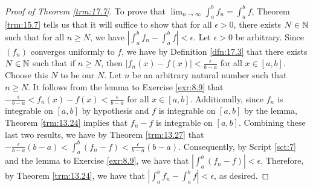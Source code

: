 \documentclass[../main.tex]{subfiles}
\begin{document}
\begin{theorem}
\begin{proof}[Proof of Theorem \ref{trm:17.7}]
        To prove that $\lim_{n\to\infty}\int_a^bf_n=\int_a^bf$, Theorem \ref{trm:15.7} tells us that it will suffice to show that for all $\epsilon>0$, there exists $N\in\mathbb{N}$ such that for all $n\geq N$, we have $|\int_a^bf_n-\int_a^bf|<\epsilon$. Let $\epsilon>0$ be arbitrary. Since $(f_n)$ converges uniformly to $f$, we have by Definition \ref{dfn:17.3} that there exists $N\in\mathbb{N}$ such that if $n\geq N$, then $|f_n(x)-f(x)|<\frac{\epsilon}{b-a}$ for all $x\in[a,b]$. Choose this $N$ to be our $N$. Let $n$ be an arbitrary natural number such that $n\geq N$. It follows from the lemma to Exercise \ref{exr:8.9} that $-\frac{\epsilon}{b-a}<f_n(x)-f(x)<\frac{\epsilon}{b-a}$ for all $x\in[a,b]$. Additionally, since $f_n$ is integrable on $[a,b]$ by hypothesis and $f$ is integrable on $[a,b]$ by the lemma, Theorem \ref{trm:13.24} implies that $f_n-f$ is integrable on $[a,b]$. Combining these last two results, we have by Theorem \ref{trm:13.27} that $-\frac{\epsilon}{b-a}(b-a)<\int_a^b(f_n-f)<\frac{\epsilon}{b-a}(b-a)$. Consequently, by Script \ref{sct:7} and the lemma to Exercise \ref{exr:8.9}, we have that $|\int_a^b(f_n-f)|<\epsilon$. Therefore, by Theorem \ref{trm:13.24}, we have that $|\int_a^bf_n-\int_a^bf|<\epsilon$, as desired.
    \end{proof}
\end{theorem}
\end{document}
